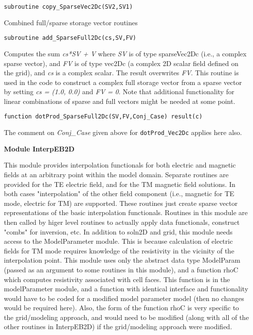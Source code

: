 \documentclass[12pt]{article}
\begin{document}
\begin{verbatim}
subroutine copy_SparseVec2Dc(SV2,SV1)
\end{verbatim}

Combined full/sparse storage vector routines

\begin{verbatim}
subroutine add_SparseFull2Dc(cs,SV,FV)
\end{verbatim}

Computes the sum {\it cs*SV + V} where {\it SV} is of type sparseVec2Dc
(i.e., a complex sparse vector), and {\it FV} is of type vec2Dc
(a complex 2D scalar field defined on the grid), 
and {\it cs} is a complex scalar.  The result overwrites {\it FV}. This
routine is used in the code to construct a complex full storage
vector from a sparse vector by setting {\it cs = (1.0, 0.0)}
and {\it FV = 0}.
Note that additional functionality for linear combinations
of sparse and full vectors might be needed at some point.

\begin{verbatim}
function dotProd_SparseFull2Dc(SV,FV,Conj_Case) result(c)
\end{verbatim}

The comment on {\it Conj\_Case} given above for \verb|dotProd_Vec2Dc|
applies here also.

\vspace{10pt}

\noindent
{\bf Module InterpEB2D}

This module provides interpolation functionals for both 
electric and magnetic fields at an arbitrary point within 
the model domain.  Separate routines are provided for
the TE electric field, and for the TM magnetic field
solutions.  In both cases "interpolation" of the other
field component (i.e., magnetic for TE mode, electric for
TM) are supported.  These routines just create sparse vector
representations of the basic interpolation functionals.  
Routines in this module are then called by higer level 
routines to actually apply data functionals, construct 
"combs" for inversion, etc.  In addition to soln2D and grid,
this module needs access to the ModelParameter module.
This is because calculation of electric fields for TM
mode requires knowledge of the resistivity in the vicinity
of the interpolation point.  This module uses only the
abstract data type ModelParam (passed as an argument
to some routines in this module), and a function rhoC
which computes resistivity associated with cell faces.
This function is in the modelParameter module, and a
function with identical interface and functionality would
have to be coded for a modified model parameter model
(then no changes would be required here).  Also, the
form of the function rhoC is very specific to the
grid/modeling approach, and would need to be modified
(along with all of the other routines in InterpEB2D)
if the grid/modeling approach were modified.
\end{document}

